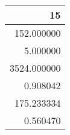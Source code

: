\begin{tabular}{r}
\toprule
15 \\
\midrule
152.000000 \\
5.000000 \\
3524.000000 \\
0.908042 \\
175.233334 \\
0.560470 \\
\bottomrule
\end{tabular}
